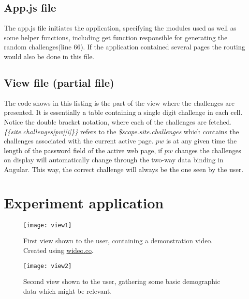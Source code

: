 \section{App.js file}\label{app:app.js}


The app.js file initiates the application, specifying the modules used as well as some helper functions, including get function responsible for generating the random challenges(line 66). If the application contained several pages the routing would also be done in this file. 

\section{View file (partial file)}\label{app:view}

The code shows in this listing is the part of the view where the challenges are presented. It is essentially a table containing a single digit challenge in each cell. Notice the double bracket notation, where each of the challenges are fetched. \emph{\{\{site.challenges[pw][i]\}\}} refers to the \emph{\$scope.site.challenges} which contains the challenges associated with the current active page. $pw$ is at any given time the length of the password field of the active web page, if $pw$ changes the challenges on display will automatically change through the two-way data binding in Angular. This way, the correct challenge will always be the one seen by the user.


\chapter{Experiment application}\label{experiment-views}

\begin{figure}
    \texttt{[image: view1]}
    \caption{First view shown to the user, containing a demonstration video. Created using \url{wideo.co}.}
    \label{view1}
\end{figure}

\begin{figure}
    \texttt{[image: view2]}
    \caption{Second view shown to the user, gathering some basic demographic data which might be relevant. }
    \label{view2}
\end{figure}


